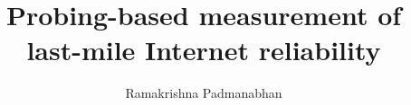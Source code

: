 \documentclass[10pt,onecolumn]{article}
\title{Probing-based measurement of last-mile Internet reliability}
\author{Ramakrishna Padmanabhan}
\begin{document}
\newcommand{\bb}{~~~~~}
\newcommand{\hdr}[1]{\multicolumn{1}{c}{\textbf{#1}}}
\newcommand\Tstrut{\rule{0pt}{2.2ex}}         %
\newcommand\Bstrut{\rule[-0.9ex]{0pt}{0pt}}   %

\maketitle










\clearpage %


\end{document}
